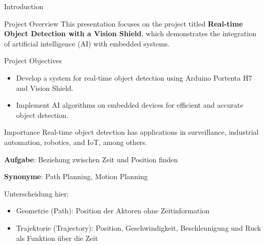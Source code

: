 %
%
%
%




{ 
	
 \begin{frame}{Introduction}
 	
 	
 	\begin{block}{Project Overview}
 		This presentation focuses on the project titled \textbf{Real-time Object Detection with a Vision Shield}, which demonstrates the integration of artificial intelligence (AI) with embedded systems.
 	\end{block}
 	
 	
 	\begin{block}{Project Objectives}
 		\begin{itemize}
 			\item Develop a system for real-time object detection using Arduino Portenta H7 and Vision Shield.
 			\item Implement AI algorithms on embedded devices for efficient and accurate object detection.
 		\end{itemize}
 	\end{block}
 	
 	\begin{block}{Importance}
 		Real-time object detection has applications in surveillance, industrial automation, robotics, and IoT, among others.
 	\end{block}
 	
 	\nocite{*}
 	
 	{\tiny 
 		\printbibliography %
 	}
 	
 \end{frame}

{ 

  \textbf{Aufgabe}: Beziehung zwischen Zeit und Position finden

  \textbf{Synonyme}: Path Planning, Motion Planning

  Unterscheidung hier:

  \begin{itemize}
    \item Geometrie (Path): Position der Aktoren ohne Zeitinformation
    \item Trajektorie (Trajectory): Position, Geschwindigkeit, Beschleunigung und Ruck als Funktion über die Zeit
  \end{itemize}

}}
